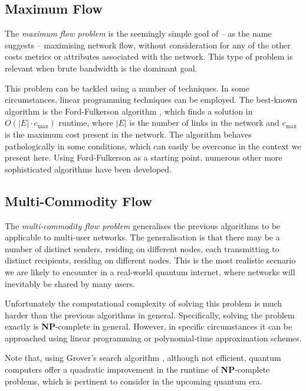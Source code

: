 \documentclass[aps,rmp,twocolumn,amsmath,amssymb,nofootinbib,superscriptaddress]{revtex4}
\begin{document}
%
%

\subsection{Maximum Flow} \label{sec:max_flow_prob}

The \emph{maximum flow problem} \cite{???} is the seemingly simple goal of -- as the name suggests -- maximising network flow, without consideration for any of the other costs metrics or attributes associated with the network. This type of problem is relevant when brute bandwidth is the dominant goal.

This problem can be tackled using a number of techniques. In some circumstances, linear programming techniques can be employed. The best-known algorithm is the Ford-Fulkerson algorithm \cite{???}, which finds a solution in \mbox{$O(|E|\cdot c_\mathrm{max})$} runtime, where $|E|$ is the number of links in the network and $c_\mathrm{max}$ is the maximum cost present in the network. The algorithm behaves pathologically in some conditions, which can easily be overcome in the context we present here. Using Ford-Fulkerson as a starting point, numerous other more sophisticated algorithms have been developed.

%
%

\subsection{Multi-Commodity Flow} \label{sec:multi_comm_flow}

The \emph{multi-commodity flow problem} \cite{???} generalises the previous algorithms to be applicable to multi-user networks. The generalisation is that there may be a number of distinct senders, residing on different nodes, each transmitting to distinct recipients, residing on different nodes. This is the most realistic scenario we are likely to encounter in a real-world quantum internet, where networks will inevitably be shared by many users.

Unfortunately the computational complexity of solving this problem is much harder than the previous algorithms in general. Specifically, solving the problem exactly is \textbf{NP}-complete in general. However, in specific circumstances it can be approached using linear programming or polynomial-time approximation schemes.

Note that, using Grover's search algorithm \cite{???}, although not efficient, quantum computers offer a quadratic improvement in the runtime of \textbf{NP}-complete problems, which is pertinent to consider in the upcoming quantum era.
\end{document}
